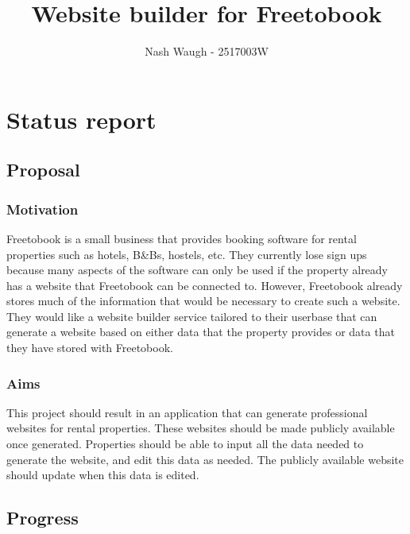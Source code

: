 \documentclass[11pt]{article}
\title{ Website builder for Freetobook }
\author{ Nash Waugh - 2517003W }
\begin{document}
\maketitle
    
    
     

\section{Status report}

\subsection{Proposal}\label{proposal}


\subsubsection{Motivation}\label{motivation}

Freetobook is a small business that provides booking software for rental properties such as hotels, B\&Bs, hostels, etc. They currently lose sign ups because many aspects of the software can only be used if the property already has a website that Freetobook can be connected to. However, Freetobook already stores much of the information that would be necessary to create such a website. They would like a website builder service tailored to their userbase that can generate a website based on either data that the property provides or data that they have stored with Freetobook.


\subsubsection{Aims}\label{aims}

This project should result in an application that can generate professional websites for rental properties. These websites should be made publicly available once generated. Properties should be able to input all the data needed to generate the website, and edit this data as needed. The publicly available website should update when this data is edited.


\subsection{Progress}\label{progress}
\end{document}
